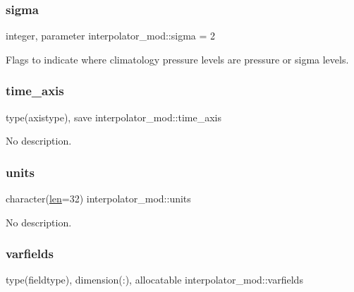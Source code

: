 \subsubsection{\texorpdfstring{sigma}{sigma}}
{\footnotesize\ttfamily integer, parameter interpolator\+\_\+mod\+::sigma = 2\hspace{0.3cm}{\ttfamily [private]}}



Flags to indicate where climatology pressure levels are pressure or sigma levels. 

\mbox{\label{namespaceinterpolator__mod_a2b93f7d5634aaa2389326983a7f4833f}} 
\subsubsection{\texorpdfstring{time\+\_\+axis}{time\_axis}}
{\footnotesize\ttfamily type(axistype), save interpolator\+\_\+mod\+::time\+\_\+axis\hspace{0.3cm}{\ttfamily [private]}}



No description. 

\mbox{\label{namespaceinterpolator__mod_a36fe3672b1616046ddec710084683407}} 
\subsubsection{\texorpdfstring{units}{units}}
{\footnotesize\ttfamily character(\hyperlink{namespaceinterpolator__mod_a6bd2ec3395203e1b6aba0610bfbfe16b}{len}=32) interpolator\+\_\+mod\+::units\hspace{0.3cm}{\ttfamily [private]}}



No description. 

\mbox{\label{namespaceinterpolator__mod_af171b4d632062544e7d7a901d55873f9}} 
\subsubsection{\texorpdfstring{varfields}{varfields}}
{\footnotesize\ttfamily type(fieldtype), dimension(\+:), allocatable interpolator\+\_\+mod\+::varfields\hspace{0.3cm}{\ttfamily [private]}}



